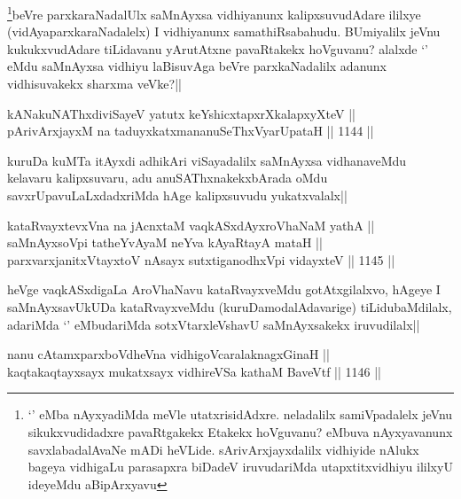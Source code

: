 \begin{artha}
\footnote{`\stext' eMba nAyxyadiMda meVle utatxrisidAdxre. neladalilx samiVpadalelx jeVnu sikukxvudidadxre pavaRtgakekx Etakekx hoVguvanu? eMbuva nAyxyavanunx savxlabadalAvaNe mADi heVLide. sArivArxjayxdalilx vidhiyide nAlukx bageya vidhigaLu parasapxra biDadeV iruvudariMda utapxtitxvidhiyu ililxyU ideyeMdu aBipArxyavu}beVre parxkaraNadalUlx saMnAyxsa vidhiyanunx kalipxsuvudAdare ililxye (vidAyaparxkaraNadalelx) I vidhiyanunx samathiRsabahudu. BUmiyalilx jeVnu kukukxvudAdare tiLidavanu yArutAtxne pavaRtakekx hoVguvanu? alalxde `\stext' eMdu saMnAyxsa vidhiyu laBisuvAga beVre parxkaNadalilx adanunx vidhisuvakekx sharxma veVke?||
\end{artha}


\begin{shl}
kANakuNAThxdiviSayeV yatutx keYshicxtapxrXkalapxyXteV || \\
pArivArxjayxM na taduyxkatxmananuSeThxVyarUpataH ||  1144 ||  
\end{shl}

\begin{artha}
kuruDa kuMTa itAyxdi adhikAri viSayadalilx saMnAyxsa vidhanaveMdu kelavaru kalipxsuvaru, adu anuSAThxnakekxbArada oMdu savxrUpavuLaLxdadxriMda hAge kalipxsuvudu yukatxvalalx||
\end{artha}


\begin{shl}
kataRvayxtevxVna na jAcnxtaM vaqkASxdAyxroVhaNaM yathA ||  \\
saMnAyxsoV\s pi tatheYvAyaM neYva kAyaRtayA mataH || \\
parxvarxjanitxVtayxtoV nAsayx sutxtiganodhxV\s pi vidayxteV ||  1145 ||  
\end{shl}

\begin{artha}
heVge vaqkASxdigaLa AroVhaNavu kataRvayxveMdu gotAtxgilalxvo, hAgeye I saMnAyxsavUkUDa kataRvayxveMdu (kuruDamodalAdavarige) tiLidubaMdilalx, adariMda `\stext' eMbudariMda sotxVtarxleVshavU saMnAyxsakekx iruvudilalx||
\end{artha}


\begin{shl}
nanu cA\s \s tamxparxboVdheVna vidhigoVcaralaknagxGinaH || \\
kaqtakaqtayxsayx mukatxsayx vidhireVSa kathaM BaveVtf ||  1146 ||  
\end{shl}

